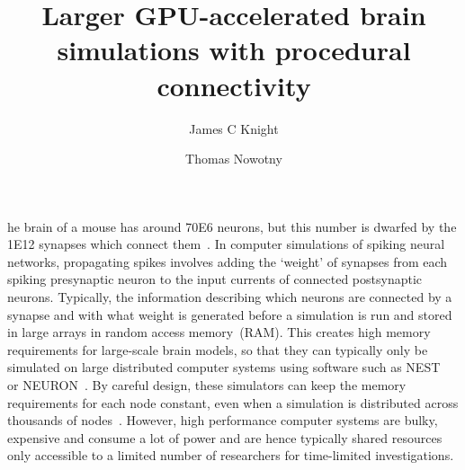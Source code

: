 \documentclass[9pt,twocolumn,twoside,lineno]{pnas-new}
\title{Larger GPU-accelerated brain simulations with procedural connectivity}
\author[a,1]{James C Knight}
\author[a]{Thomas Nowotny}
\affil[a]{Centre for Computational Neuroscience and Robotics, School of Engineering and Informatics, University of Sussex, Brighton, United Kingdom}
\newcommand{\todo}[1]{\textbf{\textsc{\textcolor{red}{(TODO: #1)}}}}
\begin{document}
\maketitle
\thispagestyle{firststyle}

he brain of a mouse has around \num{70E6} neurons, but this number is dwarfed by the \num{1E12} synapses which connect them~\citep{Herculano-Houzel2010}.
In computer simulations of spiking neural networks, propagating spikes involves  adding the `weight' of synapses from each spiking presynaptic neuron to the input currents of connected postsynaptic neurons.
Typically, the information describing which neurons are connected by a synapse and with what weight is generated before a simulation is run and stored in large arrays in random access memory~(RAM). 
This creates high memory requirements for large-scale brain models, so that they can typically only be simulated on large distributed computer systems using software such as NEST~\citep{Gewaltig2007} or NEURON~\citep{carnevale2006neuron}.
By careful design, these simulators can keep the memory requirements for each node constant, even when a simulation is distributed across thousands of nodes~\citep{Jordan2018}.
However, high performance computer systems are bulky, expensive and consume a lot of power and are hence typically shared resources only accessible to a limited number of researchers for time-limited investigations.
\end{document}
